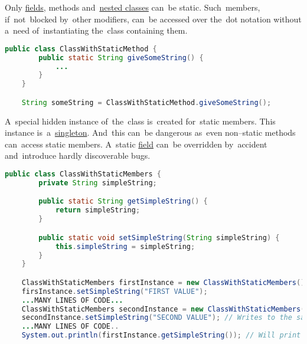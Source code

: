 \label{javaaccessmodifiers}

\label{javapublic}

\label{javaprotected}

\label{javaprivate}

\label{javastatic}
Only \hyperref[variablefieldproperty]{fields}, methods and~\hyperref[javanestedstaticclasses]{nested classes} can~be static.
Such~members, if~not~blocked by~other modifiers, can~be accessed over the~dot notation without a~need of~instantiating the~class containing them.

\begin{lstlisting}[language=Java]
    public class ClassWithStaticMethod {
        public static String giveSomeString() {
            ...
        }
    }

    String someString = ClassWithStaticMethod.giveSomeString();
\end{lstlisting}

\warning A~special hidden instance of~the~class is~created for~static members.
This instance is~a~\hyperref[singletondp]{singleton}.
And~this can~be dangerous as~even non--static methods can~access static members.
A~static \hyperref[variablefieldproperty]{field} can~be overridden by~accident and~introduce hardly discoverable bugs.

\begin{lstlisting}[language=Java]
    public class ClassWithStaticMembers {
        private String simpleString;

        public static String getSimpleString() {
            return simpleString;
        }

        public static void setSimpleString(String simpleString) {
            this.simpleString = simpleString;
        }
    }

    ClassWithStaticMembers firstInstance = new ClassWithStaticMembers();
    firsInstance.setSimpleString("FIRST VALUE");
    ...MANY LINES OF CODE...
    ClassWithStaticMembers secondInstance = new ClassWithStaticMembers();
    secondInstance.setSimpleString("SECOND VALUE"); // Writes to the same instance
    ...MANY LINES OF CODE..
    System.out.println(firstInstance.getSimpleString()); // Will print "SECOND VALUE"
\end{lstlisting}

\label{javafinal}

\label{javasynchronized}

\label{noaccessmodifier}
